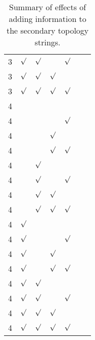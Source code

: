 \documentclass{article}
\newcommand{\tick}{\mbox{$\surd$}}
\begin{document}
\begin{table}
\begin{tabular}{|lllll|ll|}
3         & \tick         & \tick     &         & \tick  &           &           \\
3         & \tick         & \tick     & \tick   &        &           &           \\
3         & \tick         & \tick     & \tick   & \tick  &           &           \\
4         &               &           &         &        &           &           \\
4         &               &           &         & \tick  &           &           \\
4         &               &           & \tick   &        &           &           \\
4         &               &           & \tick   & \tick  &           &           \\
4         &               & \tick     &         &        &           &           \\
4         &               & \tick     &         & \tick  &           &           \\
4         &               & \tick     & \tick   &        &           &           \\
4         &               & \tick     & \tick   & \tick  &           &           \\
4         & \tick         &           &         &        &           &           \\
4         & \tick         &           &         & \tick  &           &           \\
4         & \tick         &           & \tick   &        &           &           \\
4         & \tick         &           & \tick   & \tick  &           &           \\
4         & \tick         & \tick     &         &        &           &           \\
4         & \tick         & \tick     &         & \tick  &           &           \\
4         & \tick         & \tick     & \tick   &        &           &           \\
4         & \tick         & \tick     & \tick   & \tick  &           &           \\ \hline
\end{tabular}
\caption{\label{tab:summary}Summary of effects of adding information
to the secondary topology strings.}
\end{table}
\end{document}
